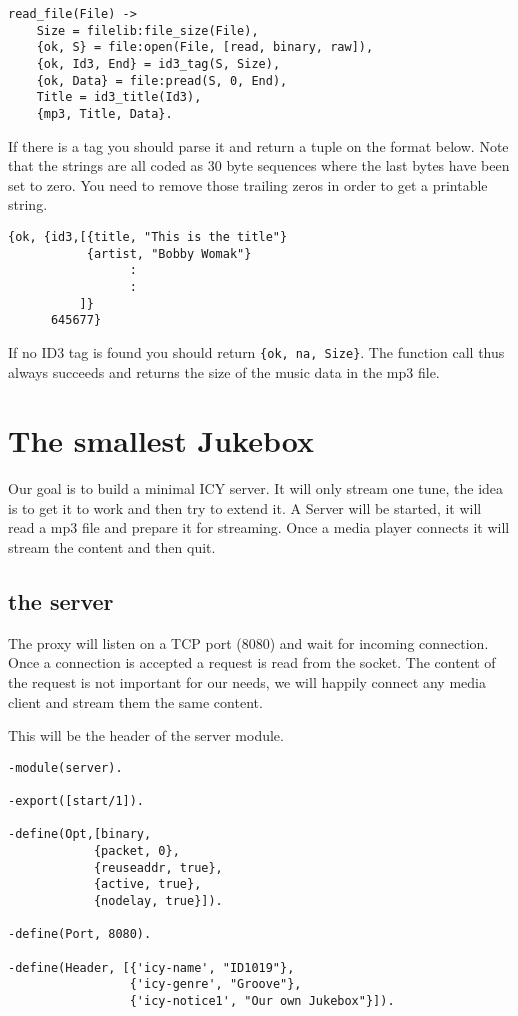 \documentclass[a4paper,dvips,11pt]{article}
\begin{document}
\begin{verbatim}
read_file(File) ->
    Size = filelib:file_size(File),
    {ok, S} = file:open(File, [read, binary, raw]),
    {ok, Id3, End} = id3_tag(S, Size),
    {ok, Data} = file:pread(S, 0, End),
    Title = id3_title(Id3),
    {mp3, Title, Data}.
\end{verbatim}

If there is a tag you should parse it and return a tuple on the
format below. Note that the strings are all coded as 30 byte
sequences where the last bytes have been set to zero. You need to
remove those trailing zeros in order to get a printable string.

\begin{verbatim}
{ok, {id3,[{title, "This is the title"}
           {artist, "Bobby Womak"}
                 :
                 :
          ]}
      645677}
\end{verbatim}

If no ID3 tag is found you should return {\tt \{ok, na, Size\}}. The
function call thus always succeeds and returns the size of the music
data in the mp3 file.


\section{The smallest Jukebox}

Our goal is to build a minimal ICY server. It will only stream one
tune, the idea is to get it to work and then try to extend it.  A
Server will be started, it will read a mp3 file and prepare it for
streaming. Once a media player connects it will stream the content and
then quit.

\subsection{the server}

The proxy will listen on a TCP port (8080) and wait for incoming
connection. Once a connection is accepted a request is read from the
socket. The content of the request is not important for our needs, we
will happily connect any media client and stream them the same content.

This will be the header of the server module. 

\begin{verbatim}
-module(server).

-export([start/1]).

-define(Opt,[binary, 
            {packet, 0}, 
            {reuseaddr, true}, 
            {active, true}, 
            {nodelay, true}]).

-define(Port, 8080).

-define(Header, [{'icy-name', "ID1019"}, 
                 {'icy-genre', "Groove"}, 
                 {'icy-notice1', "Our own Jukebox"}]).
\end{verbatim}
\end{document}
